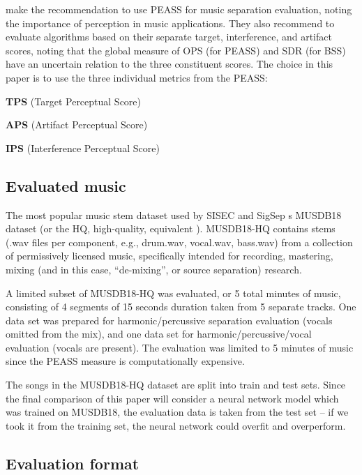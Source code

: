 \documentclass[letter,12pt]{article}
\newenvironment{tight_enumerate}{
\begin{enumerate}
  \setlength{\itemsep}{0pt}
  \setlength{\parskip}{0pt}
}{\end{enumerate}}
\begin{document}
\citet{beassvpeass} make the recommendation to use PEASS for music separation evaluation, noting the importance of perception in music applications. They also recommend to evaluate algorithms based on their separate target, interference, and artifact scores, noting that the global measure of OPS (for PEASS) and SDR (for BSS) have an uncertain relation to the three constituent scores. The choice in this paper is to use the three individual metrics from the PEASS:
\begin{tight_enumerate}
	\item
		\textbf{TPS} (Target Perceptual Score)
	\item
		\textbf{APS} (Artifact Perceptual Score)
	\item
		\textbf{IPS} (Interference Perceptual Score)
\end{tight_enumerate}

\subsection{Evaluated music}

The most popular music stem dataset used by SISEC and SigSep s MUSDB18 dataset \cite{musdb18} (or the HQ, high-quality, equivalent \cite{musdb18-hq}). MUSDB18-HQ contains stems (.wav files per component, e.g., drum.wav, vocal.wav, bass.wav) from a collection of permissively licensed music, specifically intended for recording, mastering, mixing (and in this case, ``de-mixing'', or source separation) research. 

A limited subset of MUSDB18-HQ was evaluated, or 5 total minutes of music, consisting of 4 segments of 15 seconds duration taken from 5 separate tracks. One data set was prepared for harmonic/percussive separation evaluation (vocals omitted from the mix), and one data set for harmonic/percussive/vocal evaluation (vocals are present). The evaluation was limited to 5 minutes of music since the PEASS measure is computationally expensive.

The songs in the MUSDB18-HQ dataset are split into train and test sets. Since the final comparison of this paper will consider a neural network model which was trained on MUSDB18, the evaluation data is taken from the test set -- if we took it from the training set, the neural network could overfit and overperform.

\subsection{Evaluation format}
\end{document}
